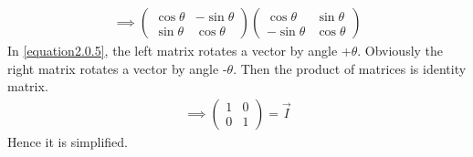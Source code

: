 \documentclass[journal,12pt,twocolumn]{IEEEtran}
\begin{document}
\begin{align}\label{equation2.0.5}
    \implies\left(\begin{array}{cc}\cos\theta & -\sin\theta \\ \sin\theta & \cos\theta\end{array}\right)\left(\begin{array}{cc}\cos\theta & \sin\theta \\ -\sin\theta & \cos\theta\end{array}\right)
\end{align}
In \eqref{equation2.0.5}, the left matrix rotates a vector by angle +$\theta$. Obviously the right matrix rotates a vector by angle -$\theta$. Then the product of matrices is identity matrix.
\begin{align}
    \implies\left(\begin{array}{cc} 1 & 0 \\ 0 & 1\end{array}\right)=\vec{I}
\end{align}
Hence it is simplified.
\end{document}
